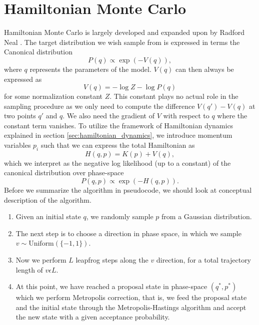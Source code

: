 \section{Hamiltonian Monte Carlo}
Hamiltonian Monte Carlo is largely developed and expanded upon by Radford Neal \cite{hmc}. The target distribution we wish sample from
is expressed in terms the Canonical distribution
\begin{equation}
  P(q) \propto \exp(-V(q)),
\end{equation}
where $q$ represents the parameters of the model. $V(q)$ can then always be expressed as
\begin{equation}
  V(q) = -\log Z - \log P(q)
\end{equation}
for some normalization constant $Z$. 
This constant plays no actual role in the sampling procedure as we only need to compute the difference $V(q') - V(q)$ at two points $q'$ and $q$.
We also need the gradient of $V$ with respect to $q$ where the constant term vanishes.
To utilize the framework of Hamiltonian dynamics explained in section \ref{sec:hamiltonian_dynamics}, we introduce momentum variables
$p_i$ such that we can express the total Hamiltonian as
\begin{equation}
  H(q, p) = K(p) + V(q),
\end{equation}
which we interpret as the negative log likelihood (up to a constant) of the canonical distribution over phase-space
\begin{equation}
  P(q, p) \propto \exp\left(-H(q,p)\right).
\end{equation}
Before we summarize the algorithm in pseudocode, we should look at conceptual description of the algorithm.
\begin{enumerate}
  \item Given an initial state $q$, we randomly sample $p$ from a Gaussian distribution.
  \item The next step is to choose a direction in phase space, in which we sample $v \sim \text{Uniform}(\{-1, 1\})$.
  \item Now we perform $L$ leapfrog steps along the $v$ direction, for a total trajectory length of $v\epsilon L$.
  \item At this point, we have reached a proposal state in phase-space $(q^*, p^*)$ which we perform Metropolis correction,
  that is, we feed the proposal state and the initial state through the Metropolis-Hastings algorithm and accept the new
  state with a given acceptance probability.
\end{enumerate}
